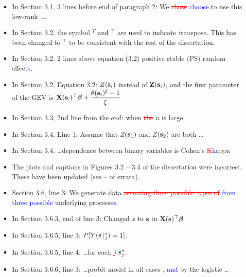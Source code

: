 \documentclass[11pt]{article}
\begin{document}
\begin{itemize}
  \item In Section 3.1, 3 lines before end of paragraph 2: We \textcolor{red}{\st{chose}} \textcolor{blue}{choose} to use this low-rank \ldots.
  \item In Section 3.2, the symbol $^T$ and $^\top$ are used to indicate transpose. This has been changed to $^\top$ to be consistent with the rest of the dissertation.
  \item In Section 3.2, 2 lines above equation (3.2) positive stable (PS) random effect\textcolor{blue}{s}.
  \item In Section 3.2, Equation 3.2: $Z(\mathbf{s}_i)$ instead of $\mathbf{Z}(\mathbf{s}_i)$, and the first parameter of the GEV is $\mathbf{X}(\mathbf{s}_i)^\top\mbox{\boldmath $\beta$} + \displaystyle \frac{\theta(\mathbf{s}_i)^\xi - 1}{\xi}$
  \item In Section 3.3, 2nd line from the end: when \textcolor{red}{\st{the}} $n$ is large.
  \item In Section 3.4, Line 1: Assume that $Z$\textcolor{blue}{$(\mathbf{s}_1)$} and $Z$\textcolor{blue}{$(\mathbf{s}_2)$} are both \ldots
  \item In Section 3.4, \ldots dependence between binary variables is Cohen's \textcolor{red}{\st{K}}\textcolor{blue}{k}appa
  \item The plots and captions in Figures 3.2 -- 3.4 of the dissertation were incorrect. These have been updated (see  --  of errata).
  \item Section 3.6, line 3: We generate data \textcolor{red}{\st{assuming three possible types of}} \textcolor{blue}{from three possible} underlying process\textcolor{blue}{es}.
  \item In Section 3.6.3, end of line 3: Changed $s$ to $\mathbf{s}$ in $\mathbf{X}(\mathbf{s})^\top \mbox{\boldmath $\beta$}$
  \item In Section 3.6.5, line 3: $P[Y(\mathbf{s}$\textcolor{red}{\st{)}}$^*_j\textcolor{blue}{)} = 1]$.
  \item In Section 3.6.5, line 4: \ldots for each \textcolor{red}{\st{$j$}} \textcolor{blue}{$\mathbf{s}^*_j$}.
  \item In Section 3.6.6, line 3: \ldots probit model in all cases \textcolor{red}{\st{,}} \textcolor{blue}{and} by the logistic \ldots
\end{itemize}
\end{document}
